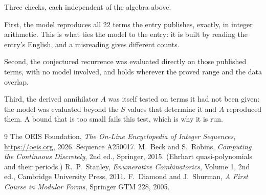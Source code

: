 \documentclass[11pt,a4paper]{article}
\theoremstyle{plain}
\theoremstyle{definition}
\begin{document}
Three checks, each independent of the algebra above.

First, the model reproduces all $22$ terms the entry publishes, exactly, in integer
arithmetic. This is what ties the model to the entry: it is built by reading the entry's
English, and a misreading gives different counts.

Second, the conjectured recurrence was evaluated directly on those published terms, with no
model involved, and holds wherever the proved range and the data overlap.

Third, the derived annihilator $A$ was itself tested on terms it had not been given: the model
was evaluated beyond the $S$ values that determine it and $A$ reproduced them. A bound that is
too small fails this test, which is why it is run.

\begin{thebibliography}{9}
 The OEIS Foundation, \emph{The On-Line Encyclopedia of Integer
Sequences}, \url{https://oeis.org}, 2026. Sequence A250017.
 M.~Beck and S.~Robins, \emph{Computing the Continuous Discretely},
2nd ed., Springer, 2015. (Ehrhart quasi-polynomials and their periods.)
 R.~P.~Stanley, \emph{Enumerative Combinatorics}, Volume 1, 2nd ed.,
Cambridge University Press, 2011.
 F.~Diamond and J.~Shurman, \emph{A First Course in Modular Forms},
Springer GTM 228, 2005.
\end{thebibliography}
\end{document}
